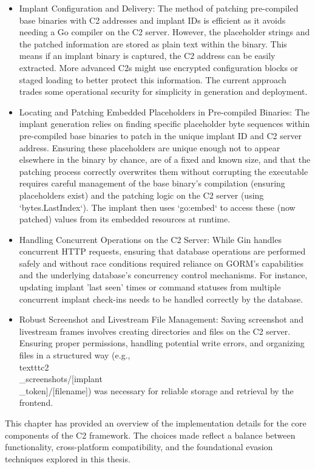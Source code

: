 \begin{itemize}
    \item Implant Configuration and Delivery: The method of patching pre-compiled base binaries with C2 addresses and implant IDs is efficient as it avoids needing a Go compiler on the C2 server. However, the placeholder strings and the patched information are stored as plain text within the binary. This means if an implant binary is captured, the C2 address can be easily extracted. More advanced C2s might use encrypted configuration blocks or staged loading to better protect this information. The current approach trades some operational security for simplicity in generation and deployment.
    \item Locating and Patching Embedded Placeholders in Pre-compiled Binaries: The implant generation relies on finding specific placeholder byte sequences within pre-compiled base binaries to patch in the unique implant ID and C2 server address. Ensuring these placeholders are unique enough not to appear elsewhere in the binary by chance, are of a fixed and known size, and that the patching process correctly overwrites them without corrupting the executable requires careful management of the base binary's compilation (ensuring placeholders exist) and the patching logic on the C2 server (using `bytes.LastIndex`). The implant then uses `go:embed` to access these (now patched) values from its embedded resources at runtime.
    \item Handling Concurrent Operations on the C2 Server: While Gin handles concurrent HTTP requests, ensuring that database operations are performed safely and without race conditions required reliance on GORM's capabilities and the underlying database's concurrency control mechanisms. For instance, updating implant 'last seen' times or command statuses from multiple concurrent implant check-ins needs to be handled correctly by the database.
    \item Robust Screenshot and Livestream File Management: Saving screenshot and livestream frames involves creating directories and files on the C2 server. Ensuring proper permissions, handling potential write errors, and organizing files in a structured way (e.g., \\texttt{c2\\_screenshots/[implant\\_token]/[filename]}) was necessary for reliable storage and retrieval by the frontend.
\end{itemize}

This chapter has provided an overview of the implementation details for the core components of the C2 framework. The choices made reflect a balance between functionality, cross-platform compatibility, and the foundational evasion techniques explored in this thesis.